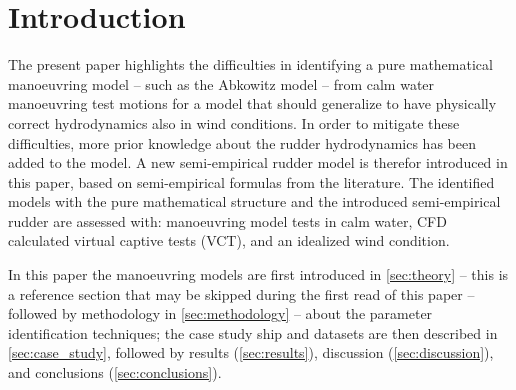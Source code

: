 \section{Introduction}
\label{sec:introduction}



The present paper highlights the difficulties in identifying a pure mathematical manoeuvring model -- such as the Abkowitz model -- from calm water manoeuvring test motions for a model that should generalize to have physically correct hydrodynamics also in wind conditions. In order to mitigate these difficulties, more prior knowledge about the rudder hydrodynamics has been added to the model. A new semi-empirical rudder model is therefor introduced in this paper, based on semi-empirical formulas from the literature. The identified models with the pure mathematical structure and the introduced semi-empirical rudder are assessed with: manoeuvring model tests in calm water, CFD calculated virtual captive tests (VCT), and an idealized wind condition.

In this paper the manoeuvring models are first introduced in \autoref{sec:theory} -- this is a reference section that may be skipped during the first read of this paper -- followed by methodology in \autoref{sec:methodology} -- about the parameter identification techniques; the case study ship and datasets are then described in \autoref{sec:case_study}, followed by results (\autoref{sec:results}), discussion (\autoref{sec:discussion}), and conclusions (\autoref{sec:conclusions}).
